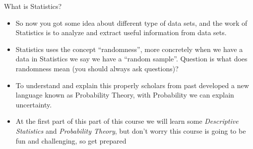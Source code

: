\documentclass[8pt, usepdftitle=false]{beamer}
\begin{document}
\begin{frame}{What is Statistics?}
\begin{itemize}

  \item So now you got some idea about different type of data sets, and the work of Statistics is to analyze and extract useful information from data sets.

  \item Statistics uses the concept \alert{``randomness''}, more concretely when we have a data in Statistics we say we have a \alert{``random sample''}. Question is what does \alert{randomness} mean (you should always ask questions)?

  \item To understand and explain this properly scholars from past developed a new language known as \alert{Probability Theory}, with Probability we can explain uncertainty.

  \item At the first part of this part of this course we will learn some \emph{Descriptive Statistics} and  \emph{Probability Theory}, but don't worry this course is going to be fun and challenging, so get prepared


\end{itemize}
\end{frame}




  


\end{document}
